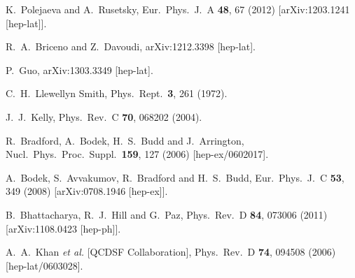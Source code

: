 \begin{thebibliography}{99}
  K.~Polejaeva and A.~Rusetsky,
  Eur.\ Phys.\ J.\ A {\bf 48}, 67 (2012)
  [arXiv:1203.1241 [hep-lat]].
  
  R.~A.~Briceno and Z.~Davoudi,
  arXiv:1212.3398 [hep-lat].
  
  P.~Guo,
  arXiv:1303.3349 [hep-lat].
  
  C.~H.~Llewellyn Smith,
  Phys.\ Rept.\  {\bf 3}, 261 (1972).

  J.~J.~Kelly,
  Phys.\ Rev.\ C {\bf 70}, 068202 (2004).
  
  R.~Bradford, A.~Bodek, H.~S.~Budd and J.~Arrington,
  Nucl.\ Phys.\ Proc.\ Suppl.\  {\bf 159}, 127 (2006)
  [hep-ex/0602017].

  A.~Bodek, S.~Avvakumov, R.~Bradford and H.~S.~Budd,
  Eur.\ Phys.\ J.\ C {\bf 53}, 349 (2008)
  [arXiv:0708.1946 [hep-ex]].

  B.~Bhattacharya, R.~J.~Hill and G.~Paz,
  Phys.\ Rev.\ D {\bf 84}, 073006 (2011)
  [arXiv:1108.0423 [hep-ph]].
  
  A.~A.~Khan {\it et al.} [QCDSF Collaboration],
  Phys.\ Rev.\ D {\bf 74}, 094508 (2006)
  [hep-lat/0603028].


\end{thebibliography}
